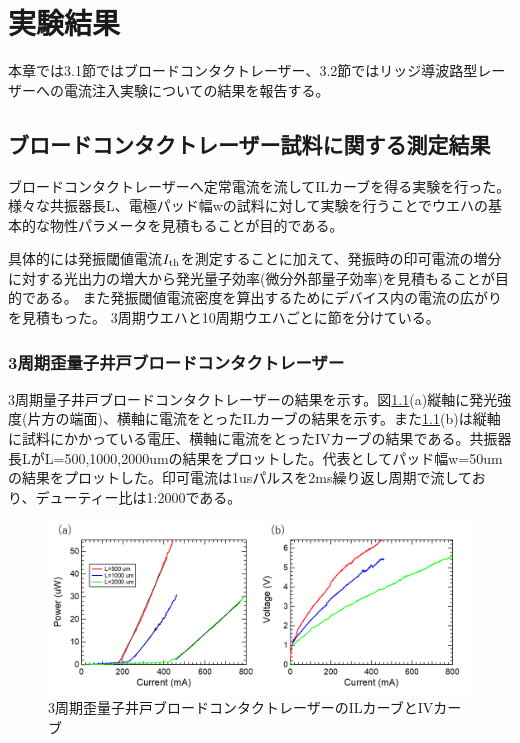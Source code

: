 \chapter{実験結果}
本章では3.1節ではブロードコンタクトレーザー、3.2節ではリッジ導波路型レーザーへの電流注入実験についての結果を報告する。
\section{ブロードコンタクトレーザー試料に関する測定結果}%
ブロードコンタクトレーザーへ定常電流を流してILカーブを得る実験を行った。様々な共振器長L、電極パッド幅wの試料に対して実験を行うことでウエハの基本的な物性パラメータを見積もることが目的である。

具体的には発振閾値電流$I_{\rm{th}}$を測定することに加えて、発振時の印可電流の増分に対する光出力の増大から発光量子効率(微分外部量子効率)を見積もることが目的である。
また発振閾値電流密度を算出するためにデバイス内の電流の広がりを見積もった。
3周期ウエハと10周期ウエハごとに節を分けている。
\subsection{3周期歪量子井戸ブロードコンタクトレーザー}%
3周期量子井戸ブロードコンタクトレーザーの結果を示す。図\ref{fig:fig_3_1_3QW_broacdcontact_IL}(a)縦軸に発光強度(片方の端面)、横軸に電流をとったILカーブの結果を示す。また\ref{fig:fig_3_1_3QW_broacdcontact_IL}(b)は縦軸に試料にかかっている電圧、横軸に電流をとったIVカーブの結果である。共振器長LがL=500,1000,2000umの結果をプロットした。代表としてパッド幅w=50umの結果をプロットした。印可電流は1usパルスを2ms繰り返し周期で流しており、デューティー比は1:2000である。

\begin{figure}[h]
	\centering
	\includegraphics[width=15cm]{figure/fig_3_1_3QW_broadcontact_IL.png}
		\caption{3周期歪量子井戸ブロードコンタクトレーザーのILカーブとIVカーブ}
		\label{fig:fig_3_1_3QW_broacdcontact_IL}
\end{figure}


